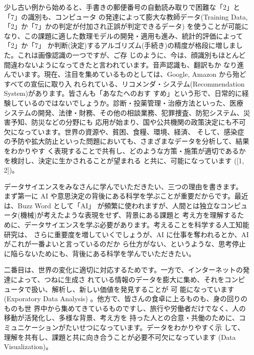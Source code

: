 \documentclass[
]{bxjsbook}
\theoremstyle{definition}
\theoremstyle{definition}
\theoremstyle{definition}
\theoremstyle{definition}
\theoremstyle{remark}
\begin{document}
少し古い例から始めると、手書きの郵便番号の自動読み取りで困難な「2」と「7」の識別も、コンピュータ の発達によって膨大な教師データ(Training Data,「2」か「7」かの判定が付加され正誤が判定できるデータ) を使うことが可能になり、この課題に適した数理モデルの開発・適用も進み、統計的評価によって「2」か「7」 か判断(決定)するアルゴリズム(手続き)の精度が格段に増しました。これは画像認識の一つですが、ご存 じのように、今は、顔識別もほとんど間違わないようになってきたと言われています。音声認識も、翻訳もか なり進んでいます。現在、注目を集めているものとしては、Google, Amazon から殆どすべての宣伝に取り入 れられている、リコメンダ・システム(Recommendation System)があります。皆さんも「あなたへのおす すめ」という形で、日常的に経験しているのではないでしょうか。診断・投薬管理・治療方法といった、医療 システムの開発、法律・財務、その他の相談業務、犯罪捜査、防犯システム、災害予知、防災などの分野にも 応用が始まり、国や公共機関の政策決定にも不可欠になっています。世界の資源や、貧困、食糧、環境、経済、 そして、感染症の予防や拡大防止といった問題においても、さまざまなデータを分析して、結果をわかりやす く表現することで共有し、どのような方策・施策が適切であるかを検討し、決定に生かされることが望まれる と共に、可能になっています ({[}1, 2{]})。

データサイエンスをみなさんに学んでいただきたい、三つの理由を書きます。
まず第一に AI や意思決定の背後にある科学を学ぶことが重要だからです。最近は、Buzz Word として「AI」 が頻繁に使われますが、人間とは独立なコンピュータ(機械)が考えたような表現をせず、背景にある課題と 考え方を理解するために、データサイエンスを学ぶ必要があります。考えることを科学する人工知能研究は、 さらに重要度を増していくでしょうが、AI に仕事を奪われるとか、AI がこれが一番よいと言っているのだか ら仕方がない、というような、思考停止に陥らないためにも、背後にある科学を学んでいただきたい。

二番目は、世界の変化に適切に対応するためです。一方で、インターネットの発達によって、つねに生成さ れている情報のデータを膨大に集め、それをコンピュータで扱い、解析し、新しい価値を発見することが 可 能になっています (Exporatory Data Analysis) 。他方で、皆さんの食卓に上るものも、身の回りのものも世
界中から集めてきているものですし、旅行や労働者だけでなく、人の移動が活発化し、多様な背景、考え方を 持った人との合意・共働のために、コミュニケーションがたいせつになっています。データをわかりやすく示 して、理解を共有し、課題と共に向き合うことが必要不可欠になっています (Data Visualization)。
\end{document}
